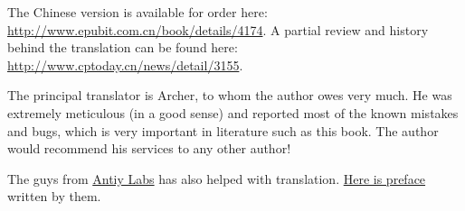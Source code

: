  The Chinese version is available for order here: \url{http://www.epubit.com.cn/book/details/4174}. A partial review and history behind the translation can be found here: \url{http://www.cptoday.cn/news/detail/3155}.

The principal translator is Archer, to whom the author owes very much. He was extremely meticulous (in a good sense) and reported most of the known mistakes and bugs, which is very important in literature such as this book.
The author would recommend his services to any other author!

The guys from \href{http://www.antiy.net/}{Antiy Labs} has also helped with translation. \href{http://www.epubit.com.cn/book/onlinechapter/51413}{Here is preface} written by them.
